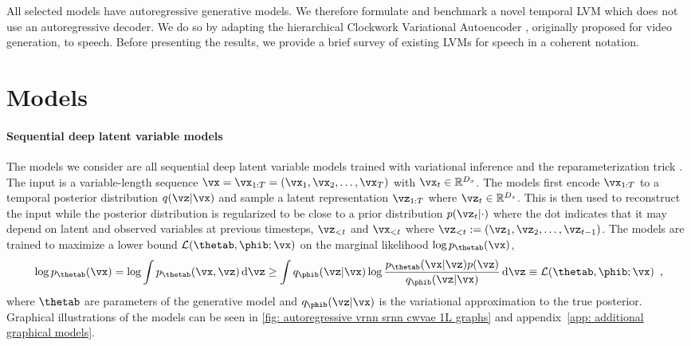 {All selected models have autoregressive generative models. We therefore formulate and benchmark a novel temporal LVM which does not use an autoregressive decoder. We do so by adapting the hierarchical Clockwork Variational Autoencoder \parencite{saxena_clockwork_2021}, originally proposed for video generation, to speech.
Before presenting the results, we provide a brief survey of existing LVMs for speech in a coherent notation. 

\section{Models}
\paragraph{Sequential deep latent variable models}
The models we consider are all sequential deep latent variable models trained with variational inference and the reparameterization trick \parencite{kingma_autoencoding_2014}.
The input is a variable-length sequence $\vx = \vx_{1:T} = \left(\vx_1, \vx_2, \dots, \vx_{T}\right)$ with $\vx_t\in\mathbb{R}^{D_x}$. 
The models first encode $\vx_{1:T}$ to a temporal posterior distribution $q(\vz|\vx)$ and sample a latent representation $\vz_{1:T}$ where $\vz_t\in\mathbb{R}^{D_z}$. This is then used to reconstruct the input while the posterior distribution is regularized to be close to a prior distribution $p(\vz_t|\cdot)$ where the dot indicates that it may depend on latent and observed variables at previous timesteps, $\vz_{<t}$ and $\vx_{<t}$ where $\vz_{<t} := \left( \vz_1, \vz_2, \dots, \vz_{t-1} \right)$. 
The models are trained to maximize a lower bound $\mathcal{L}(\thetab,\phib;\vx)$ on the marginal likelihood $\log p_\thetab(\vx)$,
\begin{equation}
    \log p_\thetab(\vx) = \log \int p_\thetab(\vx,\vz) \, \mathrm{d}\vz  \geq \int q_\phib(\vz|\vx) \log \frac{p_\thetab(\vx|\vz)p(\vz)}{q_\phib(\vz|\vx)}  \, \mathrm{d}\vz \equiv \mathcal{L}(\thetab,\phib;\vx)  \enspace , \label{eq: elbo}
\end{equation}
where $\thetab$ are parameters of the generative model and $q_\phib(\vz|\vx)$ is the variational approximation to the true posterior.
Graphical illustrations of the models can be seen in \cref{fig: autoregressive vrnn srnn cwvae 1L graphs} and appendix~\cref{app: additional graphical models}.

}
